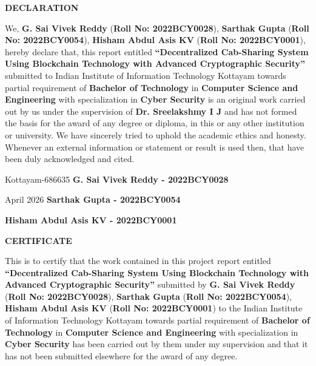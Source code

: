 \documentclass[12pt]{report}
\theoremstyle{plain}
\theoremstyle{definition}
\theoremstyle{remark}
\begin{document}
\clearpage

 \setcounter{page}{2}
\begin{center}
{\large{\bf{DECLARATION}}}
\end{center}

\noindent We, \textbf{G. Sai Vivek Reddy} (\textbf{Roll No: 2022BCY0028}), \textbf{Sarthak Gupta} (\textbf{Roll No: 2022BCY0054}), \textbf{Hisham Abdul Asis KV} (\textbf{Roll No: 2022BCY0001}), hereby declare that, this report entitled \textbf{``Decentralized Cab-Sharing System Using Blockchain Technology with Advanced Cryptographic Security''} submitted to Indian Institute of Information Technology Kottayam towards partial requirement of {\bf Bachelor of Technology} in \textbf{Computer Science and Engineering} with specialization in \textbf{Cyber Security} is an original work carried out by us under the supervision of \textbf{Dr. Sreelakshmy I J} and has not formed the basis for the award of any degree or diploma, in this or any other institution or university. We have sincerely tried to uphold the academic ethics and honesty. Whenever an external information or statement or result is used then, that have been duly acknowledged and cited.

\vspace{4cm}

\noindent Kottayam-686635 \hfill \textbf{G. Sai Vivek Reddy - 2022BCY0028}

\noindent April 2026 \hfill \textbf{Sarthak Gupta - 2022BCY0054}

\noindent \hfill \textbf{Hisham Abdul Asis KV - 2022BCY0001}

\clearpage

 \setcounter{page}{3}
\begin{center}
{\large{\bf{CERTIFICATE}}}
\end{center}

\noindent This is to certify that the work contained in this project report entitled \textbf{``Decentralized Cab-Sharing System Using Blockchain Technology with Advanced Cryptographic Security''} submitted by \textbf{G. Sai Vivek Reddy} (\textbf{Roll No: 2022BCY0028}), \textbf{Sarthak Gupta} (\textbf{Roll No: 2022BCY0054}), \textbf{Hisham Abdul Asis KV} (\textbf{Roll No: 2022BCY0001}) to the Indian Institute of Information Technology Kottayam towards partial requirement of {\bf Bachelor of Technology} in \textbf{Computer Science and Engineering} with specialization in \textbf{Cyber Security} has been carried out by them under my supervision and that it has not been submitted elsewhere for the award of any degree.
\end{document}
